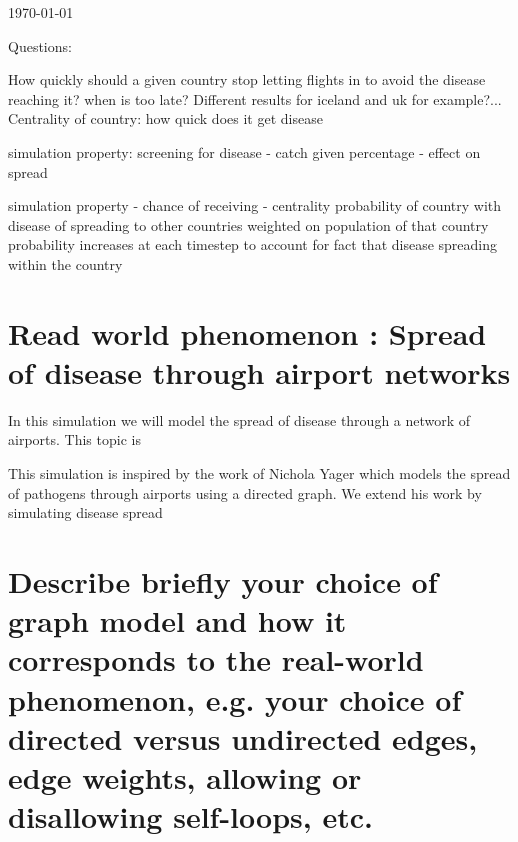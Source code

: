 \documentclass[a4paper,11pt]{article}
\begin{document}
\begin{titlepage}
{\large \today}\\[3cm] %


 

\vfill %

\end{titlepage}

Questions:

How quickly should a given country stop letting flights in to avoid the disease reaching it? when is too late? Different results for iceland and uk for example?...
Centrality of country: how quick does it get disease

simulation property: screening for disease - catch given percentage -  effect on spread

simulation property - chance of receiving - centrality
probability of country with disease of spreading to other countries weighted on population of that country
probability increases at each timestep to account for fact that disease spreading within the country




\section{Read world phenomenon : Spread of disease through airport networks}

In this simulation we will model the spread of disease through a network of airports. This topic is 

This simulation is inspired by the work of Nichola Yager which models the spread of pathogens through airports using a directed graph. We extend his work by simulating disease spread 

\section{Describe briefly your choice of graph model and how it corresponds to the real-world phenomenon, e.g. your choice of directed versus undirected edges, edge weights, allowing or disallowing self-loops, etc.}
\end{document}
